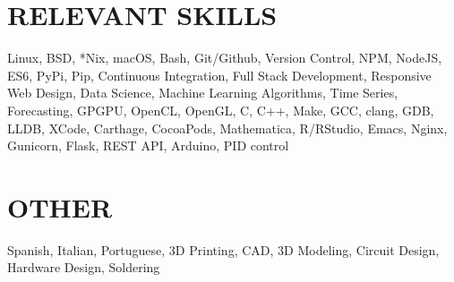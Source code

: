 \documentclass[margin]{res}
\begin{document}
\begin{resume}
  \section{RELEVANT SKILLS}
  Linux, BSD, *Nix, macOS, Bash, Git/Github, Version Control, NPM, NodeJS, ES6, PyPi, Pip, Continuous Integration,
  Full Stack Development, Responsive Web Design, Data Science, Machine Learning Algorithms, Time Series, Forecasting,
  GPGPU, OpenCL, OpenGL, C, C++, Make, GCC, clang, GDB, LLDB, XCode, Carthage,
  CocoaPods, Mathematica, R/RStudio, Emacs, Nginx, Gunicorn, Flask, REST API, Arduino, PID control

  \section{OTHER}
  Spanish, Italian, Portuguese, 3D Printing, CAD, 3D Modeling, Circuit Design,
  Hardware Design, Soldering 
 
\end{resume}
\end{document}

